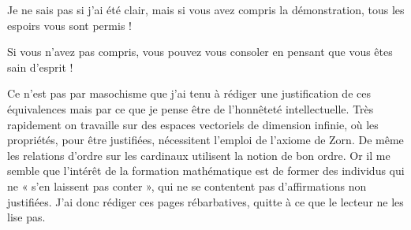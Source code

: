 Je ne sais pas si j'ai été clair, mais si vous avez compris la démonstration, tous les espoirs vous sont permis !

Si vous n'avez pas compris, vous pouvez vous consoler en pensant que vous êtes sain d'esprit !

Ce n'est pas par masochisme que j'ai tenu à rédiger une justification de ces équivalences mais par ce que je pense être de l'honnêteté intellectuelle. Très rapidement on travaille sur des espaces vectoriels de dimension infinie, où les propriétés, pour être justifiées, nécessitent l'emploi de l'axiome de Zorn. De même les relations d'ordre sur les cardinaux utilisent la notion de bon ordre. Or il me semble que l'intérêt de la formation mathématique est de former des individus qui ne « s'en laissent pas conter », qui ne se contentent pas d'affirmations non justifiées. J'ai donc  rédiger ces pages rébarbatives, quitte à ce que le lecteur ne les lise pas.
